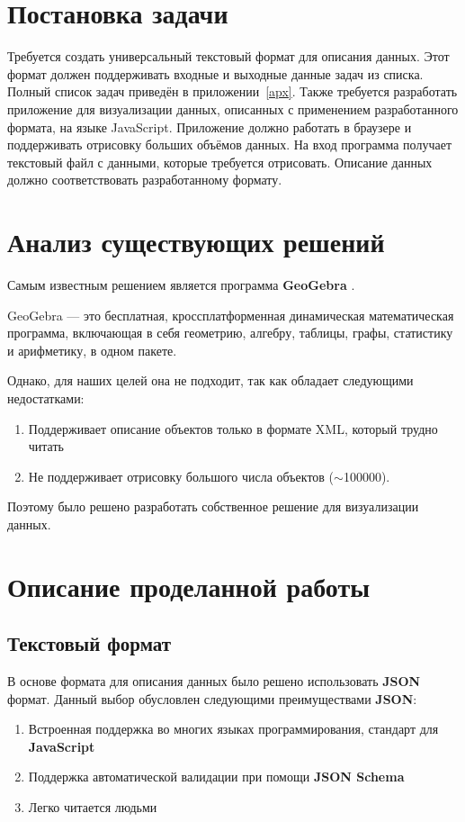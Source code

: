 \documentclass[12pt]{article}
\begin{document}
\section{Постановка задачи}

Требуется создать универсальный текстовый формат для описания данных. Этот формат должен поддерживать входные и выходные данные задач из списка. Полный список задач приведён в приложении~\ref{apx}. Также требуется разработать приложение для визуализации данных, описанных с применением разработанного формата, на языке JavaScript. Приложение должно работать в браузере и поддерживать отрисовку больших объёмов данных. 
На вход программа получает текстовый файл с данными, которые требуется отрисовать. Описание данных должно соответствовать разработанному формату.

\section{Анализ существующих решений}

Самым известным решением является программа \textbf{GeoGebra} \cite{b1}. 

GeoGebra — это бесплатная, кроссплатформенная динамическая математическая программа, включающая в себя геометрию, алгебру, таблицы, графы, статистику и арифметику, в одном пакете. 

Однако, для наших целей она не подходит, так как обладает следующими недостатками:

\begin{enumerate}
	\item Поддерживает описание объектов только в формате XML, который трудно читать
	\item Не поддерживает отрисовку большого числа объектов ($\sim$100000).
\end{enumerate}

Поэтому было решено разработать собственное решение для визуализации данных.

\section{Описание проделанной работы}

\subsection{Текстовый формат}

В основе формата для описания данных было решено использовать \textbf{JSON} формат. Данный выбор обусловлен следующими преимуществами \textbf{JSON}:
\begin{enumerate}
	\item Встроенная поддержка во многих языках программирования, стандарт для \textbf{JavaScript}
	\item Поддержка автоматической валидации при помощи \textbf{JSON Schema} \cite{b4}
	\item Легко читается людьми
\end{enumerate}
\end{document}
